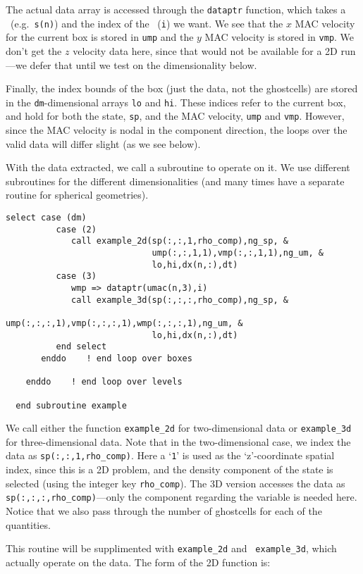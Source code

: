 The actual data array is accessed through the {\tt dataptr} function,
which takes a \multifab\ (e.g.\ {\tt s(n)}) and the index of the
\boxtype\ ({\tt i}) we want.  We see that the $x$ MAC velocity for the
current box is stored in {\tt ump} and the $y$ MAC velocity is stored
in {\tt vmp}.  We don't get the $z$ velocity data here, since that
would not be available for a 2D run---we defer that until we test on
the dimensionality below.

Finally, the index bounds of the box (just the data, not the ghostcells) are 
stored in the {\tt dm}-dimensional arrays {\tt lo} and {\tt hi}.  These indices
refer to the current box, and hold for both the state, {\tt sp}, and the MAC
velocity, {\tt ump} and {\tt vmp}.  However, since the MAC velocity is nodal
in the component direction, the loops over the valid data will differ
slight (as we see below).

With the data extracted, we call a subroutine to operate on it.  We use
different subroutines for the different dimensionalities (and many times
have a separate routine for spherical geometries).
\begin{lstlisting}[language={[95]fortran},mathescape=false]
          select case (dm)
          case (2)
             call example_2d(sp(:,:,1,rho_comp),ng_sp, &
                             ump(:,:,1,1),vmp(:,:,1,1),ng_um, &
                             lo,hi,dx(n,:),dt)
          case (3)
             wmp => dataptr(umac(n,3),i)
             call example_3d(sp(:,:,:,rho_comp),ng_sp, &
                             ump(:,:,:,1),vmp(:,:,:,1),wmp(:,:,:,1),ng_um, &
                             lo,hi,dx(n,:),dt)
          end select
       enddo    ! end loop over boxes

    enddo    ! end loop over levels

  end subroutine example
\end{lstlisting}
\noindent We call either the function
{\tt example\_2d} for two-dimensional data or {\tt example\_3d}
for three-dimensional data.  Note that in the two-dimensional
case, we index the data as {\tt sp(:,:,1,rho\_comp)}.  Here a
`{\tt 1}' is used as the `z'-coordinate spatial index, since this
is a 2D problem, and the density component of the state is selected
(using the integer key {\tt rho\_comp}).  The 3D version accesses
the data as {\tt sp(:,:,:,rho\_comp)}---only the component regarding
the variable is needed here.  Notice that we also pass through
the number of ghostcells for each of the quantities.

This routine will be supplimented with {\tt example\_2d} and {\tt
example\_3d}, which actually operate on the data.  The form of 
the 2D function is:

